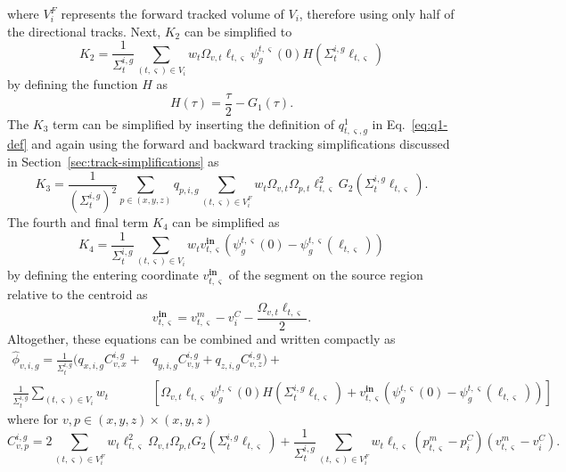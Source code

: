 where $V^F_i$ represents the forward tracked volume of $V_i$, therefore using only half of the directional tracks. Next, $K_2$ can be simplified to
\begin{equation}
K_2 = \frac{1}{\Sigma_{t}^{i,g}} \sum_{(t,\varsigma) \in V_i} w_t \Omega_{v,t} \ell_{t,\varsigma} \psi^{t,\varsigma}_g(0) H(\Sigma_{t}^{i,g} \ell_{t,\varsigma})
\end{equation}
by defining the function $H$ as
\begin{equation}
H(\tau) = \frac{\tau}{2} - G_1(\tau).
\label{eq:h}
\end{equation}
The $K_3$ term can be simplified by inserting the definition of $q^1_{t,\varsigma,g}$ in Eq.~\ref{eq:q1-def} and again using the forward and backward tracking simplifications discussed in Section~\ref{sec:track-simplifications} as
\begin{equation}
K_3 = \frac{1}{\left(\Sigma_{t}^{i,g}\right)^2} \sum_{p \in (x,y,z)} q_{p,i,g} \sum_{(t,\varsigma) \in V^F_i} w_t \Omega_{v,t} \Omega_{p,t} \ell_{t,\varsigma}^2 G_2(\Sigma_{t}^{i,g} \ell_{t,\varsigma}).
\end{equation}
The fourth and final term $K_4$ can be simplified as
\begin{equation}
K_4 = \frac{1}{\Sigma_{t}^{i,g}} \sum_{(t,\varsigma) \in V_i} w_t v^{\textbf{in}}_{t,\varsigma} \left(\psi^{t,\varsigma}_g(0) - \psi^{t,\varsigma}_g(\ell_{t,\varsigma}) \right)
\end{equation}
by defining the entering coordinate $v^{\textbf{in}}_{t,\varsigma}$ of the segment on the source region relative to the centroid as
\begin{equation}
v^{\textbf{in}}_{t,\varsigma} = v^m_{t,\varsigma} - v^C_i - \frac{\Omega_{v,t} \ell_{t,\varsigma}}{2}.
\end{equation}
Altogether, these equations can be combined and written compactly as
\begin{equation}
\begin{split}
\hat{\phi}_{v,i,g} = \frac{1}{\Sigma_{t}^{i,g}} \Bigg( q_{x,i,g} C_{v,x}^{i,g} + & q_{y,i,g} C_{v,y}^{i,g} + q_{z,i,g} C_{v,z}^{i,g} \Bigg)+  \\
\frac{1}{\Sigma_{t}^{i,g}} \sum_{(t,\varsigma) \in V_i} w_t & \left[\Omega_{v,t} \ell_{t,\varsigma} \psi^{t,\varsigma}_g(0) H(\Sigma_{t}^{i,g} \ell_{t,\varsigma}) + v^{\textbf{in}}_{t,\varsigma} \left(\psi^{t,\varsigma}_g(0) - \psi^{t,\varsigma}_g(\ell_{t,\varsigma}) \right)\right]
\end{split}
\label{eq:final-scalar-flux-moments}
\end{equation}
where for $v, p \in (x,y,z) \times (x,y,z)$
\begin{equation}
C_{v,p}^{i,g} =  2 \sum_{(t,\varsigma) \in V^F_i} w_t \ell_{t,\varsigma}^2 \Omega_{v,t} \Omega_{p,t} G_2(\Sigma_{t}^{i,g} \ell_{t,\varsigma}) + \frac{1}{\Sigma_{t}^{i,g}} \sum_{(t,\varsigma) \in V^F_i} w_t \ell_{t,\varsigma} \left( p^m_{t,\varsigma} - p^C_i \right) \left(v^m_{t,\varsigma} - v^C_i\right).
\label{eq:ls-C}
\end{equation}

